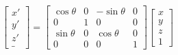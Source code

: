 \documentclass{article}
\begin{document}
\begin{gather}
		\begin{bmatrix}
		x'\\
		y'\\
		z'\\
		\_
	\end{bmatrix}
	=
	\begin{bmatrix}
		\cos \theta & 0 & -\sin \theta & 0\\
		0           & 1 & 0            & 0\\
		\sin \theta & 0 &  \cos \theta & 0\\
		0           & 0 & 0            & 1
	\end{bmatrix}
	\begin{bmatrix}
		x\\
		y\\
		z\\
		1
	\end{bmatrix}
\end{gather}

\clearpage
\end{document}
